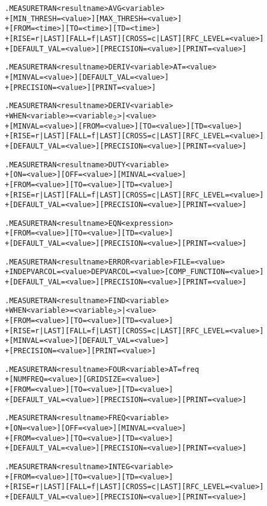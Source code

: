 \begin{Command}
\format
\begin{alltt}
.MEASURE TRAN <result name> AVG <variable>
+ [MIN_THRESH=<value>] [MAX_THRESH=<value>]
+ [FROM=<time>] [TO=<time>] [TD=<time>]
+ [RISE=r|LAST] [FALL=f|LAST] [CROSS=c|LAST] [RFC_LEVEL=<value>]
+ [DEFAULT_VAL=<value>] [PRECISION=<value>] [PRINT=<value>]

.MEASURE TRAN <result name> DERIV <variable> AT=<value>
+ [MINVAL=<value>] [DEFAULT_VAL=<value>] 
+ [PRECISION=<value>] [PRINT=<value>]

.MEASURE TRAN <result name> DERIV <variable>
+ WHEN <variable>=<variable\(\sb{2}\)>|<value>
+ [MINVAL=<value>] [FROM=<value>] [TO=<value>] [TD=<value>] 
+ [RISE=r|LAST] [FALL=f|LAST] [CROSS=c|LAST] [RFC_LEVEL=<value>]
+ [DEFAULT_VAL=<value>] [PRECISION=<value>] [PRINT=<value>]

.MEASURE TRAN <result name> DUTY <variable>
+ [ON=<value>] [OFF=<value>] [MINVAL=<value>]
+ [FROM=<value>] [TO=<value>] [TD=<value>]
+ [RISE=r|LAST] [FALL=f|LAST] [CROSS=c|LAST] [RFC_LEVEL=<value>]
+ [DEFAULT_VAL=<value>] [PRECISION=<value>] [PRINT=<value>]

.MEASURE TRAN <result name> EQN <expression> 
+ [FROM=<value>] [TO=<value>] [TD=<value>]
+ [DEFAULT_VAL=<value>] [PRECISION=<value>] [PRINT=<value>]

.MEASURE TRAN <result name> ERROR <variable> FILE=<value>
+ INDEPVARCOL=<value> DEPVARCOL=<value> [COMP_FUNCTION=<value>]
+ [DEFAULT_VAL=<value>] [PRECISION=<value>] [PRINT=<value>]

.MEASURE TRAN <result name> FIND <variable>
+ WHEN <variable>=<variable\(\sb{2}\)>|<value>
+ [FROM=<value>] [TO=<value>] [TD=<value>] 
+ [RISE=r|LAST] [FALL=f|LAST] [CROSS=c|LAST] [RFC_LEVEL=<value>]
+ [MINVAL=<value>] [DEFAULT_VAL=<value>] 
+ [PRECISION=<value>] [PRINT=<value>]

.MEASURE TRAN <result name> FOUR <variable> AT=freq
+ [NUMFREQ=<value>] [GRIDSIZE=<value>]
+ [FROM=<value>] [TO=<value>] [TD=<value>] 
+ [DEFAULT_VAL=<value>] [PRECISION=<value>] [PRINT=<value>]

.MEASURE TRAN <result name> FREQ <variable>
+ [ON=<value>] [OFF=<value>] [MINVAL=<value>]
+ [FROM=<value>] [TO=<value>] [TD=<value>] 
+ [DEFAULT_VAL=<value>] [PRECISION=<value>] [PRINT=<value>]

.MEASURE TRAN <result name> INTEG <variable>
+ [FROM=<value>] [TO=<value>] [TD=<value>]
+ [RISE=r|LAST] [FALL=f|LAST] [CROSS=c|LAST] [RFC_LEVEL=<value>]
+ [DEFAULT_VAL=<value>] [PRECISION=<value>] [PRINT=<value>]


\end{alltt}
\end{Command}
